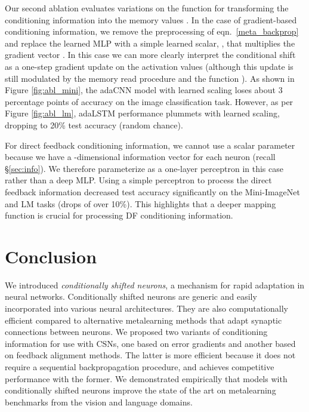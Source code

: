 \documentclass{article}
\begin{document}
Our second ablation evaluates variations on the function  for transforming the conditioning information  into the memory values .
In the case of gradient-based conditioning information, we remove the preprocessing of eqn.~\ref{meta_backprop} and replace the learned MLP with a simple learned scalar, , that multiplies the gradient vector .
In this case we can more clearly interpret the conditional shift as a one-step gradient update on the activation values (although this update is still modulated by the memory read procedure and the function ). As shown in Figure \ref{fig:abl_mini}, the adaCNN model with learned scaling loses about 3 percentage points of accuracy on the image classification task.
However, as per Figure \ref{fig:abl_lm}, adaLSTM performance plummets with learned scaling, dropping to 20\% test accuracy (random chance).

For direct feedback conditioning information, we cannot use a scalar parameter because we have a -dimensional information vector for each neuron (recall \S\ref{sec:info}). We therefore parameterize  as a one-layer perceptron in this case rather than a deep MLP.
Using a simple perceptron to process the direct feedback information decreased test accuracy significantly on the Mini-ImageNet and LM tasks (drops of over 10\%). This highlights that a deeper mapping function is crucial for processing DF conditioning information.



\section{Conclusion}
We introduced \emph{conditionally shifted neurons}, a mechanism for rapid adaptation in neural networks. 
Conditionally shifted neurons are generic and easily incorporated into various neural architectures. They are also computationally efficient compared to alternative metalearning methods that adapt synaptic connections between neurons.
We proposed two variants of conditioning information for use with CSNs, one based on error gradients and another based on feedback alignment methods. The latter is more efficient because it does not require a sequential backpropagation procedure, and achieves competitive performance with the former.
We demonstrated empirically that models with conditionally shifted neurons improve the state of the art on metalearning benchmarks from the vision and language domains.






\end{document}
